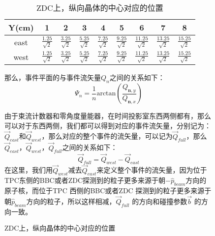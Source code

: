 \begin{figure}[htbp]
\begin{table}[htb]
\centering
\label{tab:ZDC_phi_y}
\caption{ZDC上，纵向晶体的中心对应的位置}
\begin{tabular}{|c|c|c|c|c|c|c|c|c|}
\hline
\hline
Y(cm)   &1               &2             &3              &4              &5              &6               &7               &8    \\ \hline
east    &$\frac{1.25}{\sqrt{2}}$ &$\frac{3.25}{\sqrt{2}}$ &$\frac{5.25}{\sqrt{2}}$ &$\frac{7.25}{\sqrt{2}}$ &$\frac{9.25}{\sqrt{2}}$ &$\frac{11.25}{\sqrt{2}}$ &$\frac{13.25}{\sqrt{2}}$ &$\frac{15.25}{\sqrt{2}}$                    \\ [4pt] \hline
west    &$\frac{1.25}{\sqrt{2}}$ &$\frac{3.25}{\sqrt{2}}$ &$\frac{5.25}{\sqrt{2}}$ &$\frac{7.25}{\sqrt{2}}$ &$\frac{9.25}{\sqrt{2}}$ &$\frac{11.25}{\sqrt{2}}$ &$\frac{13.25}{\sqrt{2}}$ &$\frac{15.25}{\sqrt{2}}$                    \\ [4pt]\hline
\hline
\end{tabular}
\end{table}



那么，事件平面的与事件流矢量$Q_{n}$之间的关系如下：
\begin{equation}
\label{eq:EventPlane}
\Psi_{n} = \frac{1}{n} \mathrm{arctan}(\frac{Q_{\textbf{n},y}}{Q_{\textbf{n},x}})
\end{equation}

由于束流计数器和零角度量能器，在时间投影室东西两侧都有，那么可以对于东西两侧，我们都可以得到对应的事件流矢量，分别记为：$\vec{Q}_{east}$和$\vec{Q}_{west}$，那么对应的整个事件的流矢量，可以记为$\vec{Q}_{full}$，那么$\vec{Q}_{east}$，$\vec{Q}_{west}$，$\vec{Q}_{full}$之间的关系如下：
\begin{equation}
\label{eq:full_east_west}
\vec{Q}_{full} = \vec{Q}_{west} - \vec{Q}_{east}
\end{equation}
在这里，我们用$\vec{Q}_{west}$减去$\vec{Q}_{east}$来定义整个事件的流矢量，因为位于TPC东侧的BBC或者ZDC探测到的粒子更多来源于朝$-\hat{p}_{beam}$方向的原子核，而位于TPC 西侧的BBC或者ZDC 探测到的粒子更多来源于朝$\hat{p}_{beam}$方向的粒子，所以这样相减，$\vec{Q}_{full}$ 的方向和碰撞参数$\vec{b}$ 的方向一致。


\end{figure}
